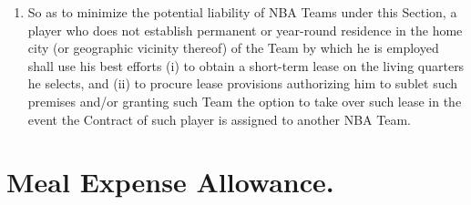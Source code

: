 \documentclass[
]{book}
\begin{document}
\begin{enumerate}
\item
  So as to minimize the potential liability of NBA Teams under this Section, a player who does not establish permanent or year-round residence in the home city (or geographic vicinity thereof) of the Team by which he is employed shall use his best efforts (i) to obtain a short-term lease on the living quarters he selects, and (ii) to procure lease provisions authorizing him to sublet such premises and/or granting such Team the option to take over such lease in the event the Contract of such player is assigned to another NBA Team.
\end{enumerate}

\hypertarget{meal-expense-allowance.}{%
\section{Meal Expense Allowance.}\label{meal-expense-allowance.}}
\end{document}
